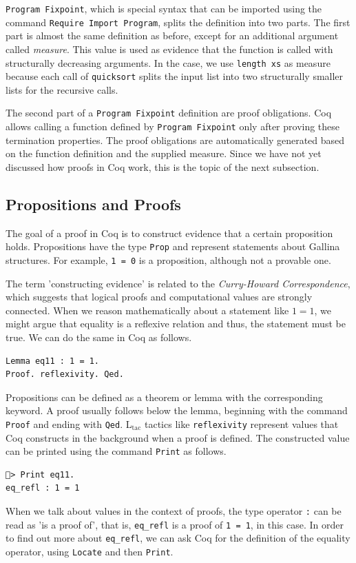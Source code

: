 \documentclass[a4paper, 11pt, fleqn, twoside, abstract=on]{scrreprt}
\newcommand{\cinl}[1]{\texttt{#1}}
\begin{document}
\cinl{Program Fixpoint}, which is special syntax that can be imported using the command \cinl{Require Import Program}, splits the definition into two parts.
The first part is almost the same definition as before, except for an additional argument called \textit{measure}.
This value is used as evidence that the function is called with structurally decreasing arguments.
In the case, we use \cinl{length xs} as measure because each call of \cinl{quicksort} splits the input list into two structurally smaller lists for the recursive calls.

The second part of a \cinl{Program Fixpoint} definition are proof obligations.
Coq allows calling a function defined by \cinl{Program Fixpoint} only after proving these termination properties.
The proof obligations are automatically generated based on the function definition and the supplied measure.
Since we have not yet discussed how proofs in Coq work, this is the topic of the next subsection.

\subsection{Propositions and Proofs}

The goal of a proof in Coq is to construct evidence that a certain proposition holds.
Propositions have the type \cinl{Prop} and represent statements about Gallina structures.
For example, \cinl{1 = 0} is a proposition, although not a provable one.

The term 'constructing evidence' is related to the \textit{Curry-Howard Correspondence}, which suggests that logical proofs and computational values are strongly connected.
When we reason mathematically about a statement like $1 = 1$, we might argue that equality is a reflexive relation and thus, the statement must be true.
We can do the same in Coq as follows.

\begin{verbatim}
Lemma eq11 : 1 = 1.
Proof. reflexivity. Qed.
\end{verbatim}

Propositions can be defined as a theorem or lemma with the corresponding keyword.
A proof usually follows below the lemma, beginning with the command \cinl{Proof} and ending with \cinl{Qed}.
L$_\text{tac}$ tactics like \cinl{reflexivity} represent values that Coq constructs in the background when a proof is defined.
The constructed value can be printed using the command \cinl{Print} as follows.

\begin{verbatim}
🐔> Print eq11.
eq_refl : 1 = 1
\end{verbatim}
\noindent
When we talk about values in the context of proofs, the type operator \cinl{:} can be read as 'is a proof of', that is, \cinl{eq_refl} is a proof of \cinl{1 = 1}, in this case.
In order to find out more about \cinl{eq_refl}, we can ask Coq for the definition of the equality operator, using \cinl{Locate} and then \cinl{Print}.
\end{document}
